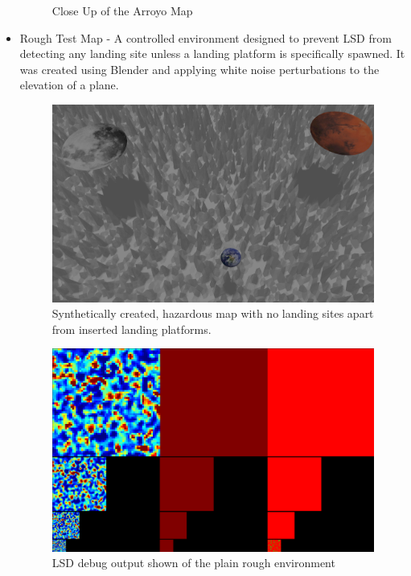 \begin{itemize}
\begin{figure}[h]
        \caption{Close Up of the Arroyo Map}
        \label{fig:sim_view_arroyo}
    \end{figure}
    \item Rough Test Map - A controlled environment designed to prevent LSD from detecting any landing site unless a landing platform is specifically spawned. It was created using Blender and applying white noise perturbations to the elevation of a plane. 
    \begin{figure}[h]
        \centering
        \includegraphics[scale=0.285]{images/evaluation/rough_test_map.png}
        \caption{Synthetically created, hazardous map with no landing sites apart from inserted landing platforms.}
    \end{figure}
    \begin{figure}[h]
        \centering
        \includegraphics[scale=0.25]{images/evaluation/rough_map_LSD.png}
        \caption{LSD debug output shown of the plain rough environment}
    \end{figure}

\end{itemize}
